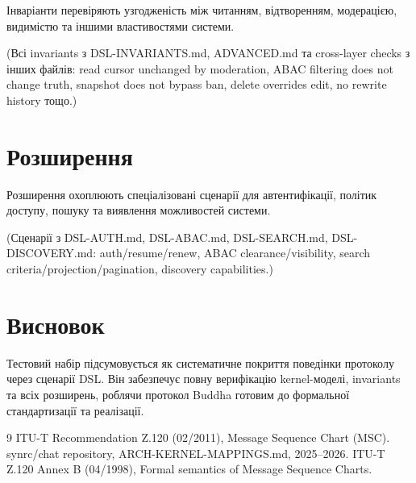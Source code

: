 \documentclass{article}
\begin{document}
Інваріанти перевіряють узгодженість між читанням, відтворенням, модерацією, видимістю та іншими властивостями системи.

(Всі invariants з DSL-INVARIANTS.md, ADVANCED.md та cross-layer checks з інших файлів: read cursor unchanged by moderation, ABAC filtering does not change truth, snapshot does not bypass ban, delete overrides edit, no rewrite history тощо.)

\section{Розширення}

Розширення охоплюють спеціалізовані сценарії для автентифікації, політик доступу, пошуку та виявлення можливостей системи.

(Сценарії з DSL-AUTH.md, DSL-ABAC.md, DSL-SEARCH.md, DSL-DISCOVERY.md: auth/resume/renew, ABAC clearance/visibility, search criteria/projection/pagination, discovery capabilities.)

\section{Висновок}

Тестовий набір підсумовується як систематичне покриття поведінки протоколу через сценарії DSL. Він забезпечує повну верифікацію kernel-моделі, invariants та всіх розширень, роблячи протокол Buddha готовим до формальної стандартизації та реалізації.


\begin{thebibliography}{9}
 ITU-T Recommendation Z.120 (02/2011), Message Sequence Chart (MSC).
 synrc/chat repository, ARCH-KERNEL-MAPPINGS.md, 2025--2026.
 ITU-T Z.120 Annex B (04/1998), Formal semantics of Message Sequence Charts.
\end{thebibliography}
\end{document}
